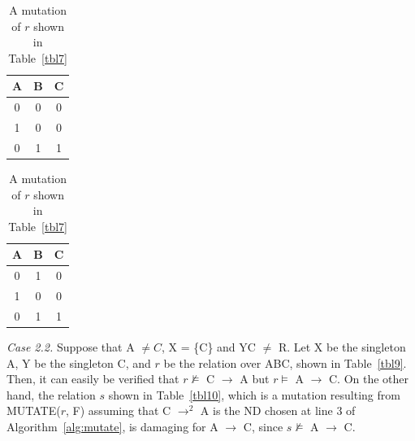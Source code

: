 \begin{table}[ht]
\begin{minipage}[b]{7cm}
\begin{center}
\begin{tabular}{|c|c|c|} \hline
A & B & C \\ \hline
0 & 0 & 0 \\
1 & 0 & 0 \\ 
0 & 1 & 1 \\ \hline
\end{tabular}
\end{center}
\caption{\label{tbl7} Example relation for Case 2.1.} 
\end{minipage}
\hfill
\begin{minipage}[b]{7cm}
\begin{center}
\begin{tabular}{|c|c|c|} \hline
A & B & C \\ \hline
0 & 1 & 0 \\
1 & 0 & 0 \\ 
0 & 1 & 1 \\ \hline
\end{tabular}
\end{center}
\caption{\label{tbl8} A mutation of $r$ shown in Table~\ref{tbl7}} 
\end{minipage}
\end{table}

{\em Case 2.2.}
Suppose that A $\not= C$, X = \{C\} and YC $\not=$ R. 
Let X be the singleton A, Y be the singleton C,
and $r$ be the relation over ABC, shown in Table~\ref{tbl9}.
Then, it can easily be verified that 
$r \not\models$ C $\to$ A but $r \models$ A $\to$ C.
On the other hand, the relation $s$ shown in Table~\ref{tbl10},
which is a mutation resulting from MUTATE($r$, F) assuming that 
C $\to^2$ A is the ND chosen at line 3 of Algorithm~\ref{alg:mutate},
is damaging for A $\to$ C, since $s \not\models$ A $\to$ C.

